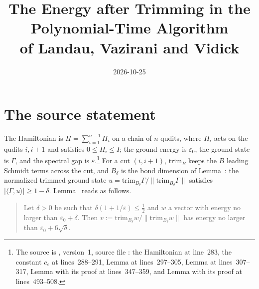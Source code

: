 \documentclass{article}
\title{The Energy after Trimming in the Polynomial-Time Algorithm\\
    of Landau, Vazirani and Vidick}
\author{}
\date{2026-10-25}
\begin{document}
\maketitle
{}

\section{The source statement}

The Hamiltonian is $H=\sum_{i=1}^{n-1}H_i$ on a chain of $n$ qudits, where
$H_i$ acts on the qudits $i,i+1$ and satisfies $0\le H_i\le I$; the ground
energy is $\varepsilon_0$, the ground state is $\Gamma$, and the spectral gap
is $\varepsilon$.\footnote{The source is \cite{Landau2013PolynomialTime},
    version~1, source file : the Hamiltonian at line~283,
    the constant $c_\varepsilon$ at lines~288--291, Lemma
     at lines~297--305, Lemma
     at lines~307--317, Lemma  with its proof
    at lines~347--359, and Lemma  with its proof at
    lines~493--508.}
For a cut $(i,i+1)$, $\mathrm{trim}_B$ keeps the $B$ leading Schmidt terms
across the cut, and $B_\delta$ is the bond dimension of
Lemma~: the normalized trimmed ground state
$u=\mathrm{trim}_{B_\delta}\Gamma/\|\mathrm{trim}_{B_\delta}\Gamma\|$
satisfies $|\langle\Gamma,u\rangle|\ge1-\delta$. Lemma~ reads as
follows.

\begin{quote}
    Let $\delta>0$ be such that $\delta(1+1/\varepsilon)\le\frac12$ and $w$ a
    vector with energy no larger than $\varepsilon_0+\delta$. Then
    $v:=\mathrm{trim}_{B_\delta}w/\|\mathrm{trim}_{B_\delta}w\|$ has energy no
    larger than $\varepsilon_0+6\sqrt\delta$.
\end{quote}
\end{document}
